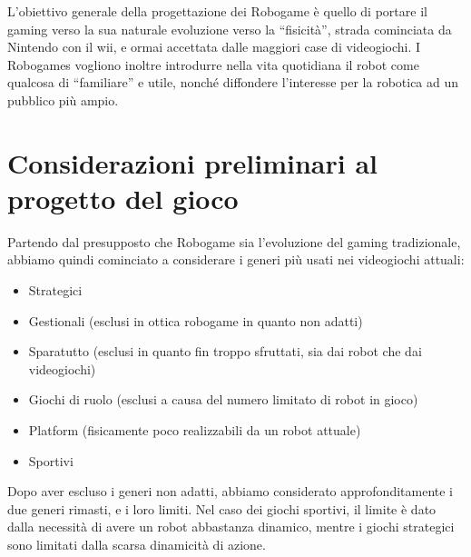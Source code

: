L'obiettivo generale della progettazione dei Robogame è quello di portare il gaming verso la sua naturale evoluzione verso la ``fisicità'', strada cominciata da Nintendo con il wii, e ormai accettata dalle maggiori case di videogiochi. I Robogames vogliono inoltre introdurre nella vita quotidiana il robot come qualcosa di ``familiare'' e utile, nonché diffondere l'interesse per la robotica ad un pubblico più ampio.

\section{Considerazioni preliminari al progetto del gioco}
Partendo dal presupposto che Robogame sia l’evoluzione del gaming tradizionale, abbiamo quindi cominciato a considerare i generi più usati nei videogiochi attuali:
\begin{itemize}
\item Strategici
\item Gestionali (esclusi in ottica robogame in quanto non adatti)
\item Sparatutto (esclusi in quanto fin troppo sfruttati, sia dai robot che dai videogiochi)
\item Giochi di ruolo (esclusi a causa del numero limitato di robot in gioco)
\item Platform (fisicamente poco realizzabili da un robot attuale)
\item Sportivi
\end{itemize}
Dopo aver escluso i generi non adatti, abbiamo considerato approfonditamente i due generi rimasti, e i loro limiti. Nel caso dei giochi sportivi, il limite è dato dalla necessità di avere un robot abbastanza dinamico, mentre i giochi strategici sono limitati dalla scarsa dinamicità di azione.

